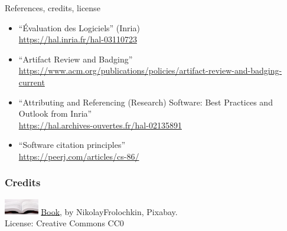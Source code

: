 \documentclass[17pt,aspectratio=169,hyperref={pdfusetitle,colorlinks,allcolors=olive}]{beamer}
\begin{document}
\begin{frame}[fragile]

  {\huge References, credits, license}
\end{frame}

\begin{frame}[fragile]

  {\small
    \begin{itemize}
    \item ``Évaluation des Logiciels'' (Inria) \\
      {\footnotesize \url{https://hal.inria.fr/hal-03110723}}
    \item ``Artifact Review and Badging'' \\
      {\footnotesize \url{https://www.acm.org/publications/policies/artifact-review-and-badging-current}}
    \item ``Attributing and Referencing (Research) Software: Best Practices and Outlook from Inria'' \\
      {\footnotesize \url{https://hal.archives-ouvertes.fr/hal-02135891}}
    \item ``Software citation principles'' \\
      {\footnotesize \url{https://peerj.com/articles/cs-86/}}
    \end{itemize}
  }  
\end{frame}


\begin{frame}[fragile]
  \frametitle{Credits}

  \includegraphics[width=1.5cm]{figs/bookpages}
  {\small \href{https://pixabay.com/en/book-reading-library-literature-1261800/}{Book}, by NikolayFrolochkin, Pixabay. \\ License: Creative Commons CC0\\}

\end{frame}
\end{document}
